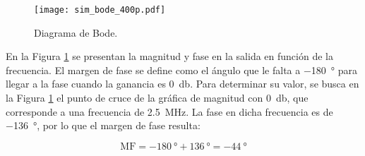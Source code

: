 \begin{figure}[H]
	\centering
	\texttt{[image: sim\_bode\_400p.pdf]}
	\caption{Diagrama de Bode.}
	\label{fig:sim_bode}
\end{figure}

En la Figura \ref{fig:sim_bode} se presentan la magnitud y fase en la salida en función de la frecuencia.
El margen de fase se define como el ángulo que le falta a \SI{-180}{\degree} para llegar a la fase cuando la ganancia es \SI{0}{\decibel}. Para determinar su valor, se busca en la Figura \ref{fig:sim_bode} el punto de cruce de la gráfica de magnitud con \SI{0}{\decibel}, que corresponde a una frecuencia de \SI{2.5}{\mega\hertz}. La fase en dicha frecuencia es de \SI{-136}{\degree}, por lo que el margen de fase resulta:

	$$ \mathrm{MF} = \SI{-180}{\degree} + \SI{136}{\degree} = \boxed{\SI{-44}{\degree}} $$